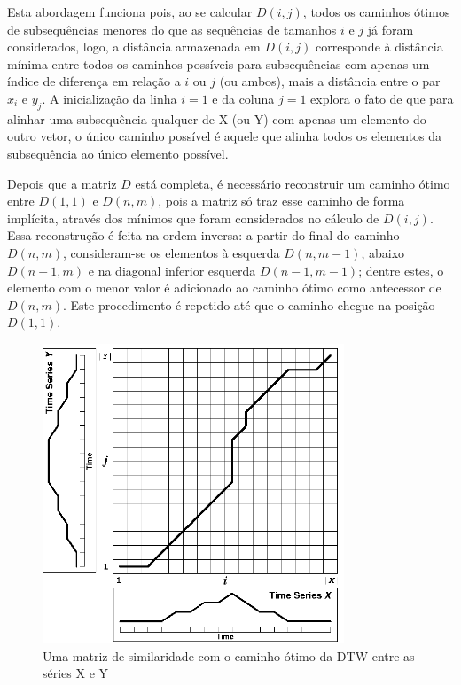 Esta abordagem funciona pois, ao se calcular $D(i,j)$, todos os caminhos ótimos de subsequências menores do que as sequências de tamanhos $i$ e $j$ já foram considerados, logo, a distância armazenada em $D(i, j)$ corresponde à distância mínima entre todos os caminhos possíveis para subsequências com apenas um índice de diferença em relação a $i$ ou $j$ (ou ambos), mais a distância entre o par $x_i$ e $y_j$. A inicialização da linha $i=1$ e da coluna $j=1$ explora o fato de que para alinhar uma subsequência qualquer de X (ou Y) com apenas um elemento do outro vetor, o único caminho possível é aquele que alinha todos os elementos da subsequência ao único elemento possível.

Depois que a matriz $D$ está completa, é necessário reconstruir um caminho ótimo entre $D(1, 1)$ e $D(n, m)$, pois a matriz só traz esse caminho de forma implícita, através dos mínimos que foram considerados no cálculo de $D(i,j)$. Essa reconstrução é feita na ordem inversa: a partir do final do caminho $D(n, m)$, consideram-se os elementos à esquerda $D(n,m-1)$, abaixo $D(n-1,m)$ e na diagonal inferior esquerda $D(n-1,m-1)$; dentre estes, o elemento com o menor valor é adicionado ao caminho ótimo como antecessor de $D(n,m)$. Este procedimento é repetido até que o caminho chegue na posição $D(1, 1)$.

\begin{figure}[htb]
\centering
\includegraphics[width=9cm]{figuras/dtw_warp_path.png}
\caption{Uma matriz de similaridade com o caminho ótimo da DTW entre as séries X e Y\citep{salvador2007toward}}
\label{fig:dtw-matrix-and-path}
\end{figure}

